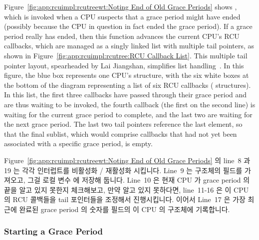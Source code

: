 Figure~\ref{fig:app:rcuimpl:rcutreewt:Noting End of Old Grace Periods}
shows , which is invoked when a CPU suspects
that a grace period might have ended (possibly because the CPU in question
in fact ended the grace period).
If a grace period really has ended, then this function advances the
current CPU's RCU callbacks, which are managed as a singly linked
list with multiple tail pointers, as shown in
Figure~\ref{fig:app:rcuimpl:rcutree:RCU Callback List}.
This multiple tail pointer layout, spearheaded by
Lai Jiangshan, simplifies list
handling~\cite{LaiJiangshan2008NewClassicAlgorithm}.
In this figure, the blue box represents one CPU's 
structure, with the six white boxes at the bottom of the diagram
representing a list of six RCU callbacks ( structures).
In this list, the first three callbacks have passed through their
grace period and are thus waiting to be invoked, the fourth
callback (the first on the second line) is waiting for the current
grace period to complete, and the last two are waiting for the
next grace period.
The last two tail pointers reference the last element, so that the
final sublist, which would comprise callbacks that had not yet been
associated with a specific grace period, is empty.
\fi

Figure~\ref{fig:app:rcuimpl:rcutreewt:Noting End of Old Grace Periods}
의 line~8 과 19 는 각각 인터럽트를 비활성화 / 재활성화 시킵니다.
Line~9 는  구조체의  필드를 가져오고, 그걸 로컬
변수  에 저장해 둡니다.
Line~10 은 현재 CPU 가 grace period 의 끝을 알고 있지 못한지 체크해보고, 만약
알고 있지 못하다면, line~11-16 은 이 CPU 의 RCU 콜백들을 tail 포인터들을
조정해서 진행시킵니다.
이어서 Line~17 은 가장 최근에 완료된 grace period 의 숫자를 
필드의 이 CPU 의  구조체에 기록합니다.
\iffalse

Lines~8 and 19 of
Figure~\ref{fig:app:rcuimpl:rcutreewt:Noting End of Old Grace Periods}
suppress and re-enable interrupts, respectively.
Line~9 picks up a snapshot of the \co{rcu_state} structure's
\co{->completed} field, storing it in the local variable
\co{completed_snap}.
Line~10 checks to see if the current CPU is not yet aware of the
end of a grace period, and if it is not aware,
lines~11-16 advance this CPU's RCU callbacks by manipulating the
tail pointers.
Line~17 then records the most recently completed grace period number
in this CPU's \co{rcu_data} structure in the \co{->completed}
field.
\fi

\subsubsection{Starting a Grace Period}
\label{app:rcuimpl:rcutreewt:Starting a Grace Period}

